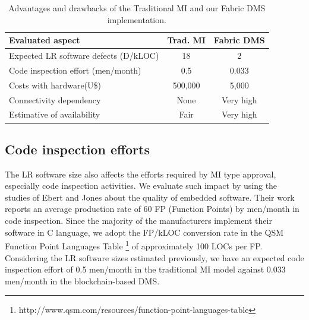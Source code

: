 \documentclass[journal]{IEEEtran}
\begin{document}
\begin{table}[t!]
\centering
\caption{Advantages and drawbacks of the Traditional MI and our Fabric DMS implementation.}
\label{t:quantitative}
\begin{tabularx}{0.48\textwidth}{|l|c|c|}
\hline
\textbf{Evaluated aspect}             & \textbf{Trad. MI} & \textbf{Fabric DMS} \\ \hline
Expected LR software defects (D/kLOC) & 18                      & 2                   \\ \hline
Code inspection effort (men/month)    & 0.5                     & 0.033               \\ \hline
Costs with hardware\protect\footnotemark (U\$)             & 500,000                 & 5,000               \\ \hline
Connectivity dependency               & None                    & Very high           \\ \hline
Estimative of availability            & Fair                    & Very high           \\ \hline
\end{tabularx}
\end{table}


\subsection{Code inspection efforts}
The LR software size also affects the efforts required by MI type approval, especially code inspection activities.
We evaluate such impact by using the studies of Ebert and Jones \cite{Ebert2009} about the quality of embedded software.
Their work reports an average production rate of 60 FP (Function Points) by men/month in code inspection.
Since the majority of the manufacturers implement their software in C language, we adopt the FP/kLOC conversion rate in the QSM Function Point Languages Table \footnote{http://www.qsm.com/resources/function-point-languages-table} of approximately 100 LOCs per FP.
Considering the LR software sizes estimated previously, we have an expected code inspection effort of  0.5 men/month in the traditional MI model against 0.033 men/month in the blockchain-based DMS.
\end{document}

